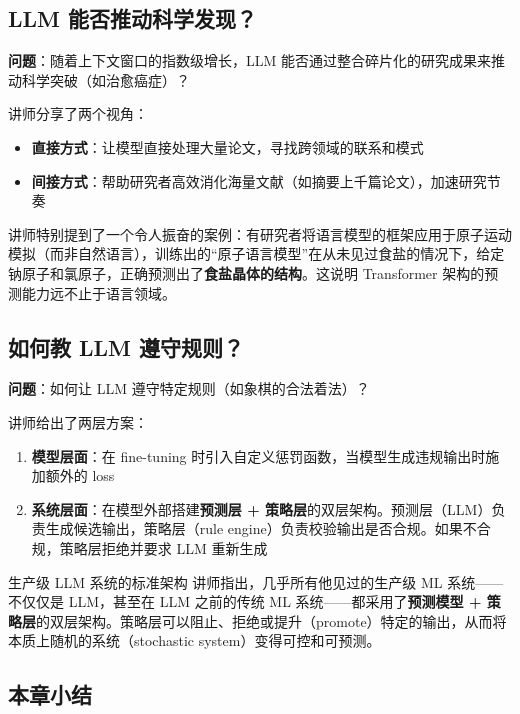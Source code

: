 \documentclass[a4paper]{article}
\begin{document}
\subsection{LLM 能否推动科学发现？}

\textbf{问题}：随着上下文窗口的指数级增长，LLM 能否通过整合碎片化的研究成果来推动科学突破（如治愈癌症）？

讲师分享了两个视角：
\begin{itemize}
    \item \textbf{直接方式}：让模型直接处理大量论文，寻找跨领域的联系和模式
    \item \textbf{间接方式}：帮助研究者高效消化海量文献（如摘要上千篇论文），加速研究节奏
\end{itemize}

讲师特别提到了一个令人振奋的案例：有研究者将语言模型的框架应用于原子运动模拟（而非自然语言），训练出的``原子语言模型''在从未见过食盐的情况下，给定钠原子和氯原子，正确预测出了\textbf{食盐晶体的结构}。这说明 Transformer 架构的预测能力远不止于语言领域。

\subsection{如何教 LLM 遵守规则？}

\textbf{问题}：如何让 LLM 遵守特定规则（如象棋的合法着法）？

讲师给出了两层方案：

\begin{enumerate}
    \item \textbf{模型层面}：在 fine-tuning 时引入自定义惩罚函数，当模型生成违规输出时施加额外的 loss
    \item \textbf{系统层面}：在模型外部搭建\textbf{预测层 + 策略层}的双层架构。预测层（LLM）负责生成候选输出，策略层（rule engine）负责校验输出是否合规。如果不合规，策略层拒绝并要求 LLM 重新生成
\end{enumerate}

\begin{knowledgebox}{生产级 LLM 系统的标准架构}
讲师指出，几乎所有他见过的生产级 ML 系统——不仅仅是 LLM，甚至在 LLM 之前的传统 ML 系统——都采用了\textbf{预测模型 + 策略层}的双层架构。策略层可以阻止、拒绝或提升（promote）特定的输出，从而将本质上随机的系统（stochastic system）变得可控和可预测。
\end{knowledgebox}

\subsection{本章小结}
\end{document}
